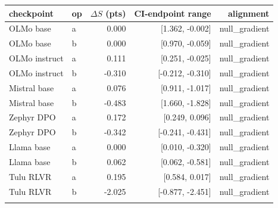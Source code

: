 \begin{tabular}{ll rr r}
\toprule
checkpoint & op & \multicolumn{1}{c}{$\Delta S$ (pts)} & \multicolumn{1}{c}{CI-endpoint range} & alignment \\
\midrule
OLMo base & a & 0.000 & [1.362, -0.002] & null\_gradient \\
OLMo base & b & 0.000 & [0.970, -0.059] & null\_gradient \\
\addlinespace
OLMo instruct & a & 0.111 & [0.251, -0.025] & null\_gradient \\
OLMo instruct & b & -0.310 & [-0.212, -0.310] & null\_gradient \\
\addlinespace
Mistral base & a & 0.076 & [0.911, -1.017] & null\_gradient \\
Mistral base & b & -0.483 & [1.660, -1.828] & null\_gradient \\
\addlinespace
Zephyr DPO & a & 0.172 & [0.249, 0.096] & null\_gradient \\
Zephyr DPO & b & -0.342 & [-0.241, -0.431] & null\_gradient \\
\addlinespace
Llama base & a & 0.000 & [0.010, -0.320] & null\_gradient \\
Llama base & b & 0.062 & [0.062, -0.581] & null\_gradient \\
\addlinespace
Tulu RLVR & a & 0.195 & [0.584, 0.017] & null\_gradient \\
Tulu RLVR & b & -2.025 & [-0.877, -2.451] & null\_gradient \\
\addlinespace
\bottomrule
\end{tabular}
